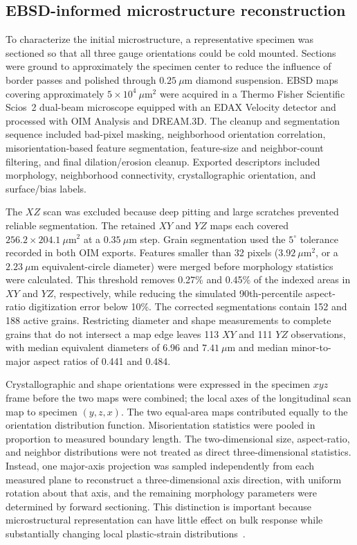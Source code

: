 \documentclass[final,12pt]{cas-sc}
\begin{document}
\subsection{EBSD-informed microstructure reconstruction}

To characterize the initial microstructure, a representative specimen was sectioned so that all three gauge orientations could be cold mounted. Sections were ground to approximately the specimen center to reduce the influence of border passes and polished through $0.25~\mu$m diamond suspension. EBSD maps covering approximately $5\times10^4~\mu\mathrm{m}^2$ were acquired in a Thermo Fisher Scientific Scios~2 dual-beam microscope equipped with an EDAX Velocity detector and processed with OIM Analysis and DREAM.3D. The cleanup and segmentation sequence included bad-pixel masking, neighborhood orientation correlation, misorientation-based feature segmentation, feature-size and neighbor-count filtering, and final dilation/erosion cleanup. Exported descriptors included morphology, neighborhood connectivity, crystallographic orientation, and surface/bias labels.

The $XZ$ scan was excluded because deep pitting and large scratches prevented reliable segmentation. The retained $XY$ and $YZ$ maps each covered $256.2\times204.1~\mu\mathrm{m}^2$ at a $0.35~\mu$m step. Grain segmentation used the $5^\circ$ tolerance recorded in both OIM exports. Features smaller than 32 pixels ($3.92~\mu\mathrm{m}^2$, or a $2.23~\mu$m equivalent-circle diameter) were merged before morphology statistics were calculated. This threshold removes 0.27\% and 0.45\% of the indexed areas in $XY$ and $YZ$, respectively, while reducing the simulated 90th-percentile aspect-ratio digitization error below 10\%. The corrected segmentations contain 152 and 188 active grains. Restricting diameter and shape measurements to complete grains that do not intersect a map edge leaves 113 $XY$ and 111 $YZ$ observations, with median equivalent diameters of 6.96 and $7.41~\mu$m and median minor-to-major aspect ratios of 0.441 and 0.484.

Crystallographic and shape orientations were expressed in the specimen $xyz$ frame before the two maps were combined; the local axes of the longitudinal scan map to specimen $(y,z,x)$. The two equal-area maps contributed equally to the orientation distribution function. Misorientation statistics were pooled in proportion to measured boundary length. The two-dimensional size, aspect-ratio, and neighbor distributions were not treated as direct three-dimensional statistics. Instead, one major-axis projection was sampled independently from each measured plane to reconstruct a three-dimensional axis direction, with uniform rotation about that axis, and the remaining morphology parameters were determined by forward sectioning. This distinction is important because microstructural representation can have little effect on bulk response while substantially changing local plastic-strain distributions~\cite{dingreville2010microstructure}.
\end{document}

